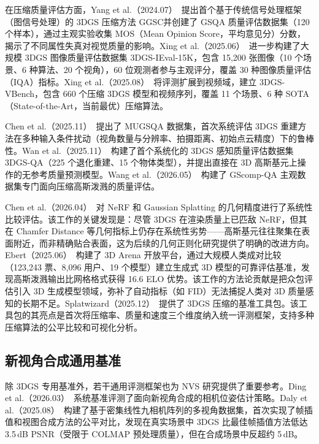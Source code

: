 在压缩质量评估方面，Yang et al.（2024.07）~\cite{2407_14197}提出首个基于传统信号处理框架（图信号处理）的 3DGS 压缩方法 GGSC并创建了 GSQA 质量评估数据集（120 个样本），通过主观实验收集 MOS（Mean Opinion Score，平均意见分）分数，揭示了不同属性失真对视觉质量的影响。Xing et al.（2025.06）~\cite{2506_14642}进一步构建了大规模 3DGS 图像质量评估数据集 3DGS-IEval-15K，包含 15,200 张图像（10 个场景、6 种算法、20 个视角），60 位观测者参与主观评分，覆盖 30 种图像质量评估（IQA）指标。Xing et al.（2025.08）~\cite{2508_07038}将评测扩展到视频域，建立 3DGS-VBench，包含 660 个压缩 3DGS 模型和视频序列，覆盖 11 个场景、6 种 SOTA（State-of-the-Art，当前最优）压缩算法。

Chen et al.（2025.11）~\cite{2511_06830}提出了 MUGSQA 数据集，首次系统评估 3DGS 重建方法在多种输入条件扰动（视角数量与分辨率、拍摄距离、初始点云精度）下的鲁棒性。Wan et al.（2025.11）~\cite{2511_08032}构建了首个系统化的 3DGS 感知质量评估数据集 3DGS-QA（225 个退化重建、15 个物体类型），并提出直接在 3D 高斯基元上操作的无参考质量预测模型。Wang et al.（2026.05）~\cite{2605_26880}构建了 GScomp-QA 主观数据集专门面向压缩高斯泼溅的质量评估。

Chen et al.（2026.04）~\cite{2604_18205}对 NeRF 和 Gaussian Splatting 的几何精度进行了系统性比较评估。该工作的关键发现是：尽管 3DGS 在渲染质量上已匹敌 NeRF，但其在 Chamfer Distance 等几何指标上仍存在系统性劣势——高斯基元往往聚集在表面附近，而非精确贴合表面，这为后续的几何正则化研究提供了明确的改进方向。Ebert（2025.06）~\cite{2506_18787}构建了 3D Arena 开放平台，通过大规模人类成对比较（123,243 票、8,096 用户、19 个模型）建立生成式 3D 模型的可靠评估基准，发现高斯泼溅输出比网格格式获得 16.6 ELO 优势。该工作的方法论贡献是把众包评估引入 3D 生成模型领域，弥补了自动指标（如 FID）无法捕捉人类对 3D 质量感知的长期不足。Splatwizard（2025.12）~\cite{2512_24742}提供了 3DGS 压缩的基准工具包。该工具包的其亮点是首次将压缩率、质量和速度三个维度纳入统一评测框架，支持多种压缩算法的公平比较和可视化分析。

\subsection{新视角合成通用基准}

除 3DGS 专用基准外，若干通用评测框架也为 NVS 研究提供了重要参考。Ding et al.（2026.03）~\cite{2603_20428}系统基准评测了面向新视角合成的相机位姿估计策略。Daly et al.（2025.08）~\cite{2508_09068}构建了基于密集线性九相机阵列的多视角数据集，首次实现了帧插值和视图合成方法的公平对比，发现在真实场景中 3DGS 比最佳帧插值方法低达 3.5\,dB PSNR（受限于 COLMAP 预处理质量），但在合成场景中反超约 5\,dB。

